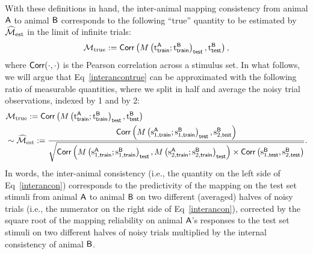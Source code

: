 With these definitions in hand, the inter-animal mapping consistency from animal $\animalA$ to animal $\animalB$ corresponds to the following ``true'' quantity to be estimated by $\Mest$ in the limit of infinite trials:
\begin{equation}\label{interancontrue}
\mathcal{M}_{\text{true}} := \corr\left(M\left(\trueA;\trueB\right)_{\test}, \trueBtest\right),
\end{equation}
where $\corr(\cdot, \cdot)$ is the Pearson correlation across a stimulus set.
In what follows, we will argue that Eq~\eqref{interancontrue} can be approximated with the following ratio of measurable quantities, where we split in half and average the noisy trial observations, indexed by 1 and by 2:
\begin{equation}\label{interancon}
\begin{split}
& \Mtrue := \corr\left(M\left(\trueA;\trueB\right)_{\test}, \trueBtest\right) \\
& \sim \Mest := \dfrac{\corr\left(M\left(\sfAtrain;\sfBtrain\right)_{\test}, \ssBtest\right)}{\sqrt{\corr\left(M\left(\sfAtrain;\sfBtrain\right)_{\test}, M\left(\ssAtrain;\ssBtrain\right)_{\test}\right) \times \corr\left(\sfBtest, \ssBtest\right)}}.
\end{split}
\end{equation}
In words, the inter-animal consistency (i.e., the quantity on the left side of Eq~\eqref{interancon}) corresponds to the predictivity of the mapping on the test set stimuli from animal $\animalA$ to animal $\animalB$ on two different (averaged) halves of noisy trials (i.e., the numerator on the right side of Eq~\eqref{interancon}), corrected by the square root of the mapping reliability on animal $\animalA$'s responses to the test set stimuli on two different halves of noisy trials multiplied by the internal consistency of animal $\animalB$.

